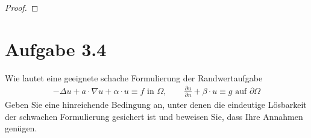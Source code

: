 \documentclass[12pt,a4paper]{article}
\begin{document}
\begin{proof}

\end{proof}

\section*{Aufgabe 3.4}
Wie lautet eine geeignete schache Formulierung der Randwertaufgabe
\begin{align*}
-\Delta u+a\cdot\nabla u+\alpha\cdot u\equiv f\text{ in }\Omega,\qquad\frac{\partial u}{\partial n}+\beta\cdot u\equiv g\text{ auf } \partial\Omega
\end{align*}
Geben Sie eine hinreichende Bedingung an, unter denen die eindeutige Lösbarkeit der schwachen Formulierung gesichert ist und beweisen Sie, dass Ihre Annahmen genügen.
\end{document}
